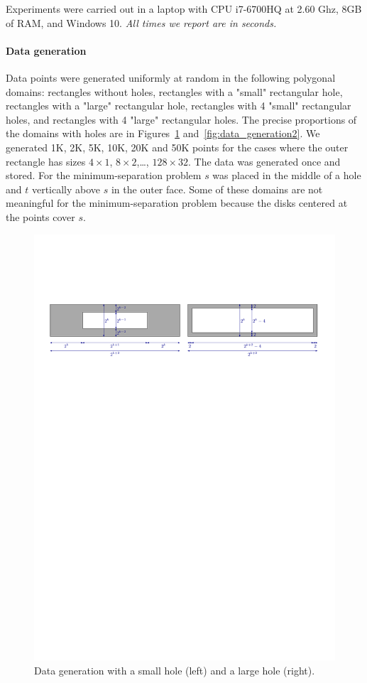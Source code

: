 \documentclass[a4paper,11pt]{article}
\begin{document}
Experiments were carried out in a laptop with CPU i7-6700HQ at 2.60 Ghz, 
8GB of RAM, and Windows 10. \emph{All times we report are in seconds.}

\paragraph{Data generation}
Data points were generated uniformly at random in the following polygonal domains:
rectangles without holes, rectangles with a "small" rectangular hole, rectangles
with a "large" rectangular hole, rectangles with 4 "small" rectangular holes, 
and rectangles with 4 "large" rectangular holes. The precise proportions of the domains
with holes are in Figures~\ref{fig:data_generation1} and~\ref{fig:data_generation2}.
We generated 1K, 2K, 5K, 10K, 20K and 50K points for the cases where the outer rectangle
has sizes $4\times 1$, $8\times 2$,\ldots, $128\times 32$.
The data was generated once and stored.
For the minimum-separation problem $s$ was placed in the middle of a hole and 
$t$ vertically above $s$ in the outer face.  
Some of these domains are not meaningful for the minimum-separation problem 
because the disks centered at the points cover $s$. 

\begin{figure}
	\includegraphics[width=\textwidth,page=1]{data_generation}
	\caption{Data generation with a small hole (left) and a large hole (right).}
	\label{fig:data_generation1}
\end{figure}
\end{document}
